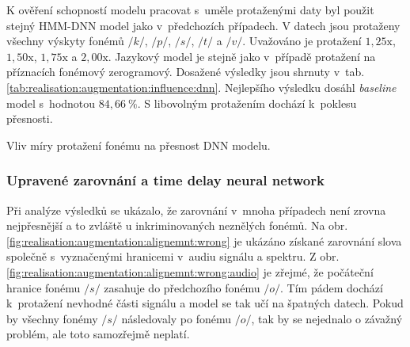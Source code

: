 K ověření schopností modelu pracovat s~uměle protaženými daty byl použit stejný HMM-DNN model jako v~předchozích případech.
V datech jsou protaženy všechny výskyty fonémů $/k/$, $/p/$, $/s/$, $/t/$ a $/v/$. Uvažováno je protažení $1,25\mathrm{x}$, $1,50\mathrm{x}$, $1,75\mathrm{x}$ a $2,00\mathrm{x}$. Jazykový model je stejně jako v~případě protažení na příznacích fonémový zerogramový.
Dosažené výsledky jsou shrnuty v~tab. \ref{tab:realisation:augmentation:influence:dnn}.
Nejlepšího výsledku dosáhl \textit{baseline} model s~hodnotou $84,66~\%$.
S libovolným protažením dochází  k~poklesu přesnosti.

\begin{table}[htpb]
  \centering
  \def\arraystretch{1.5}
  \caption{Vliv míry protažení fonému na přesnost DNN modelu.}
  \label{tab:realisation:augmentation:influence:dnn}
\end{table}

\subsubsection{Upravené zarovnání a time delay neural network}

Při analýze výsledků se ukázalo, že zarovnání v~mnoha případech není zrovna nejpřesnější a to zvláště u inkriminovaných neznělých fonémů.
Na obr. \ref{fig:realisation:augmentation:alignemnt:wrong} je ukázáno získané zarovnání slova  společně s~vyznačenými hranicemi v~audiu signálu a spektru.
Z obr. \ref{fig:realisation:augmentation:alignemnt:wrong:audio} je zřejmé, že počáteční hranice fonému $/s/$ zasahuje do předchozího fonému $/o/$.
Tím pádem dochází  k~protažení nevhodné části signálu a model se tak učí na špatných datech.
Pokud by všechny fonémy $/s/$ následovaly po fonému $/o/$, tak by se nejednalo o závažný problém, ale toto samozřejmě neplatí.

